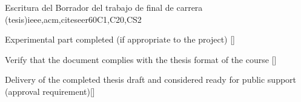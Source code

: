 \begin{syllabus}
\begin{unit}{Escritura del Borrador del trabajo de final de carrera (tesis)}{}{ieee,acm,citeseer}{60}{C1,C20,CS2}
\begin{learningoutcomes}
    \item Experimental part completed (if appropriate to the project) [\Assessment]
    \item Verify that the document complies with the thesis format of the course [\Assessment]
    \item Delivery of the completed thesis draft and considered ready for public support (approval requirement)[\Assessment]
\end{learningoutcomes}
\end{unit}

\begin{coursebibliography}
\end{coursebibliography}
\end{syllabus}
